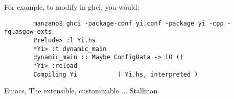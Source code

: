 For example, to modify  in ghci, you would:

\begin{verbatim}
        manzano$ ghci -package-conf yi.conf -package yi -cpp -fglasgow-exts
        Prelude> :l Yi.hs
        *Yi> :t dynamic_main
        dynamic_main :: Maybe ConfigData -> IO ()
        *Yi> :reload
        Compiling Yi           ( Yi.hs, interpreted )
\end{verbatim}

\begin{thebibliography}[50]
\bibitem Emacs, The extensible, customizable ... Stallman.
\end{thebibliography}
